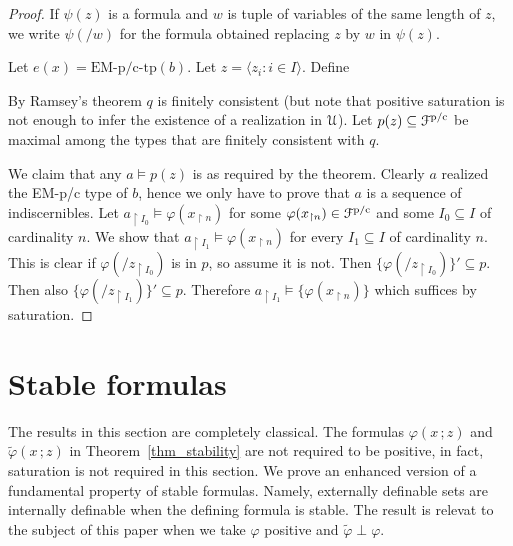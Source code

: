 \documentclass{amsproc}
\begin{document}
{\begin{proof}
  If $\psi(z)$ is a formula and $w$ is tuple of variables of the same length of $z$, we write $\psi(/w)$ for the formula obtained replacing $z$ by $w$ in $\psi(z)$.

  Let $e(x)=\mbox{EM-p/c-tp}(b)$.
  Let $z=\langle z_i:i\in I\rangle$.
  Define



  By Ramsey's theorem $q$ is finitely consistent (but note that positive saturation is not enough to infer the existence of a realization in ${\EuScript U}$).
  Let $p(z)\subseteq{\EuScript F}^{\rm p/c}$ be maximal among the types that are finitely consistent with $q$.

  We claim that any $a\models p(z)$ is as required by the theorem.
  Clearly $a$ realized the EM-p/c type of $b$, hence we only have to prove that $a$ is a sequence of indiscernibles.
  Let $a_{\restriction I_0}\models\varphi(x_{\restriction n})$ for some $\varphi(x_{\restriction n})\in{\EuScript F}^{\rm p/c}$ and some $I_0\subseteq I$ of cardinality $n$.
  We show that $a_{\restriction I_1}\models\varphi(x_{\restriction n})$ 
  for every $I_1\subseteq I$ of cardinality $n$.
  This is clear if $\varphi(/z_{\restriction I_0})$ is in $p$, so assume it is not.
  Then $\{\varphi(/z_{\restriction I_0})\}'\subseteq p$.
  Then also $\{\varphi(/z_{\restriction I_1})\}'\subseteq p$.
  Therefore  $a_{\restriction I_1}\models\{\varphi(x_{\restriction n})\}$ which suffices by saturation.
\end{proof}


\section{Stable formulas}

\def\ceq#1#2#3{\parbox[t]{24ex}{$\displaystyle #1$}\parbox[t]{6ex}{$\displaystyle\hfil #2$}{$\displaystyle #3$}}

The results in this section are completely classical.
The formulas $\varphi(x\,;z)$ and $\tilde\varphi(x\,;z)$ in Theorem~\ref{thm_stability} are not required to be positive, in fact, saturation is not required in this section. 
We prove an enhanced version of a fundamental property of stable formulas.
Namely, externally definable sets are internally definable when the defining formula is stable.
The result is relevat to the subject of this paper when we take $\varphi$ positive and $\tilde\varphi\perp\varphi$.

}
\end{document}
